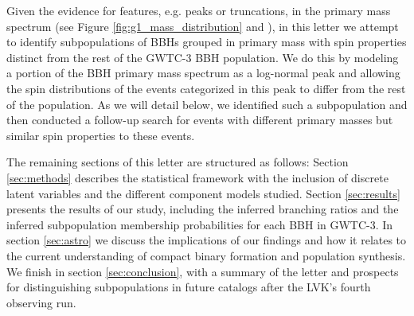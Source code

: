 Given the evidence for features, e.g. peaks or truncations, in the primary mass spectrum (see Figure \ref{fig:g1_mass_distribution} and \citet{10.3847/2041-8213/aa9bf6, 10.3847/1538-4357/aab34c, 2019ApJ...882L..24A, 2021ApJ...913L...7A, 2021arXiv211103634T, 2022ApJ...928..155T}), in this letter we attempt to identify subpopulations of BBHs grouped in primary mass with spin properties distinct from the rest of the GWTC-3 BBH population. We do this by modeling a portion of the BBH primary mass spectrum as a log-normal peak and allowing the spin distributions of the events categorized in this peak to differ from the rest of the population. As we will detail below, we identified such a subpopulation and then conducted a follow-up search for events with different primary masses but similar spin properties to these events.

The remaining sections of this letter are structured as follows: Section \ref{sec:methods} describes the statistical framework with the inclusion of discrete latent variables and the different component models studied. Section \ref{sec:results} presents the results of our study, including the inferred branching ratios and the inferred subpopulation membership probabilities for each BBH in GWTC-3. In section \ref{sec:astro} we discuss the implications of our findings and how it relates to the current understanding of compact binary formation and population synthesis. We finish in section \ref{sec:conclusion}, with a summary of the letter and prospects for distinguishing subpopulations in future catalogs after the LVK's fourth observing run.